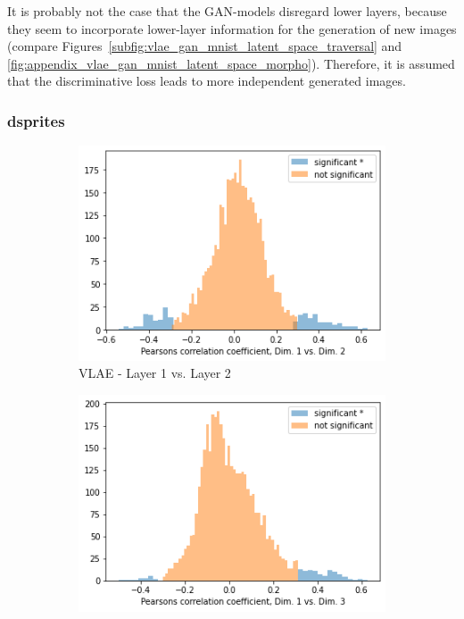 It is probably not the case that the \ac{GAN}-models disregard lower layers, because they seem to incorporate lower-layer information for the generation of new images (compare Figures~\ref{subfig:vlae_gan_mnist_latent_space_traversal} and \ref{fig:appendix_vlae_gan_mnist_latent_space_morpho}).
Therefore, it is assumed that the discriminative loss leads to more independent generated images.

\subsubsection{dsprites}

\begin{figure}
    \centering
    \begin{subfigure}{.3\textwidth}
        \includegraphics[width=\textwidth]{images/notprop/dsprites/vlae/dim_1_2.png}
        \caption{\ac{VLAE} - Layer 1 vs. Layer 2}
    \end{subfigure}
    \hfill
    \begin{subfigure}{.3\textwidth}
        \includegraphics[width=\textwidth]{images/notprop/dsprites/vlae/dim_1_3.png}

\end{subfigure}
\end{figure}
